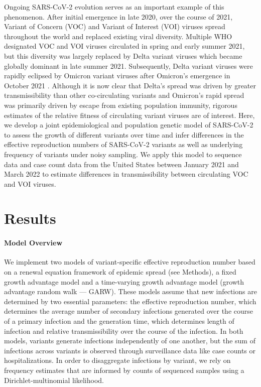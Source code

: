 Ongoing SARS-CoV-2 evolution serves as an important example of this phenomenon.
After initial emergence in late 2020, over the course of 2021, Variant of Concern (VOC) and Variant of Interest (VOI) viruses spread throughout the world and replaced existing viral diversity.
Multiple WHO designated \cite{Konings2021} VOC and VOI viruses circulated in spring and early summer 2021, but this diversity was largely replaced by Delta variant viruses which became globally dominant in late summer 2021.
Subsequently, Delta variant viruses were rapidly eclipsed by Omicron variant viruses after Omicron's emergence in October 2021 \cite{viana2022rapid}.
Although it is now clear that Delta's spread was driven by greater transmissibility than other co-circulating variants and Omicron's rapid spread was primarily driven by escape from existing population immunity, rigorous estimates of the relative fitness of circulating variant viruses are of interest.
Here, we develop a joint epidemiological and population genetic model of SARS-CoV-2 to assess the growth of different variants over time and infer differences in the effective reproduction numbers of SARS-CoV-2 variants as well as underlying frequency of variants under noisy sampling.
We apply this model to sequence data and case count data from the United States between January 2021 and March 2022 to estimate differences in transmissibility between circulating VOC and VOI viruses.

\section{Results}

\paragraph{Model Overview}%

We implement two models of variant-specific effective reproduction number based on a renewal equation framework of epidemic spread (see Methods), a fixed growth advantage model and a time-varying growth advantage model (growth advantage random walk --- GARW).
These models assume that new infections are determined by two essential parameters: the effective reproduction number, which determines the average number of secondary infections generated over the course of a primary infection and the generation time, which determines length of infection and relative transmissibility over the course of the infection.
In both models, variants generate infections independently of one another, but the sum of infections across variants is observed through surveillance data like case counts or hospitalizations.
In order to disaggregate infections by variant, we rely on frequency estimates that are informed by counts of sequenced samples using a Dirichlet-multinomial likelihood.

